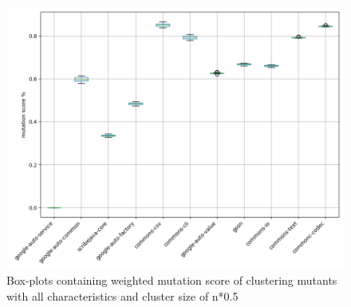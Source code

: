 \documentclass[../../main]{subfiles}
\begin{document}
\begin{figure}[H]
\includegraphics[width=\textwidth]{images/boxplot_summary/boxplot_hc_full_0.5.png}
\caption{\label{box:clustering_all_50}Box-plots containing weighted mutation score of clustering mutants with all characteristics and cluster size of n*0.5}
\end{figure}
\end{document}
